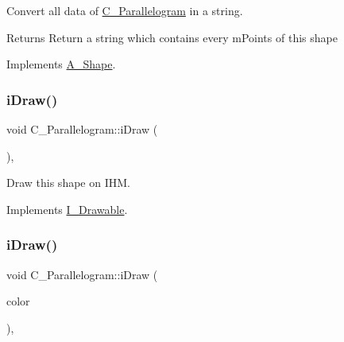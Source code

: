 Convert all data of \hyperlink{classC__Parallelogram}{C\+\_\+\+Parallelogram} in a string. 

\begin{DoxyReturn}{Returns}
Return a string which contains every m\+Points of this shape 
\end{DoxyReturn}


Implements \hyperlink{classA__Shape_ad8804b4e74543db374af6892367b7c2e}{A\+\_\+\+Shape}.

\mbox{\label{classC__Parallelogram_a6d43cc787a39def68c7b7de4a33caf5e}} 
\subsubsection{\texorpdfstring{i\+Draw()}{iDraw()}\hspace{0.1cm}{\footnotesize\ttfamily [1/2]}}
{\footnotesize\ttfamily void C\+\_\+\+Parallelogram\+::i\+Draw (\begin{DoxyParamCaption}{ }\end{DoxyParamCaption})\hspace{0.3cm}{\ttfamily [override]}, {\ttfamily [virtual]}}



Draw this shape on I\+HM. 



Implements \hyperlink{classI__Drawable_ae24c65000977a805f52ce032321cd86f}{I\+\_\+\+Drawable}.

\mbox{\label{classC__Parallelogram_a044ce6d1042ea93589a38f4686489862}} 
\subsubsection{\texorpdfstring{i\+Draw()}{iDraw()}\hspace{0.1cm}{\footnotesize\ttfamily [2/2]}}
{\footnotesize\ttfamily void C\+\_\+\+Parallelogram\+::i\+Draw (\begin{DoxyParamCaption}\item[{M\+L\+V\+\_\+\+Color}]{color }\end{DoxyParamCaption})\hspace{0.3cm}{\ttfamily [override]}, {\ttfamily [virtual]}}



